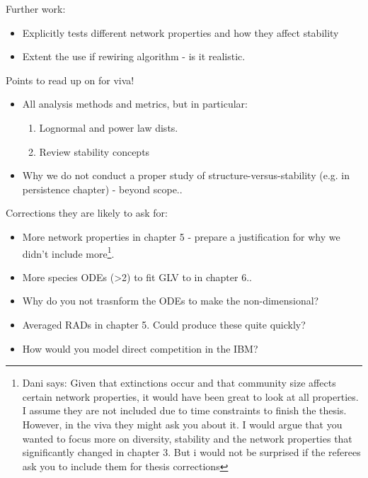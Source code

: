 Further work:
\begin{itemize}
	\item Explicitly tests different network properties and how they affect stability 
	\item Extent the use if rewiring algorithm - is it realistic.
\end{itemize}

Points to read up on for viva!

\begin{itemize}
	\item All analysis methods and metrics, but in particular:
	\begin{enumerate}
		\item Lognormal and power law dists. \cite{mcgill2007species}
		\item Review stability concepts \cite{donohue2013dimensionality}
	\end{enumerate}		
	
	\item Why we do not conduct a proper study of structure-versus-stability (e.g. in persistence chapter) - beyond scope..
\end{itemize}


Corrections they are likely to ask for:

\begin{itemize}
	\item More network properties in chapter 5 - prepare a justification for why we didn't include more\footnote{Dani says: Given that extinctions occur and that community size affects certain network properties, it would have been great to look at all properties. I assume they are not included due to time constraints to finish the thesis. However, in the viva they might ask you about it. I would argue that you wanted to focus more on diversity, stability and the network properties that significantly changed in chapter 3. But i would not be surprised if the referees ask you to include them for thesis corrections}.
	\item More species ODEs (>2) to fit GLV to in chapter 6..
	\item Why do you not trasnform the ODEs to make the non-dimensional?
	\item Averaged RADs in chapter 5. Could produce these quite quickly?
	\item How would you model direct competition in the IBM?
\end{itemize}